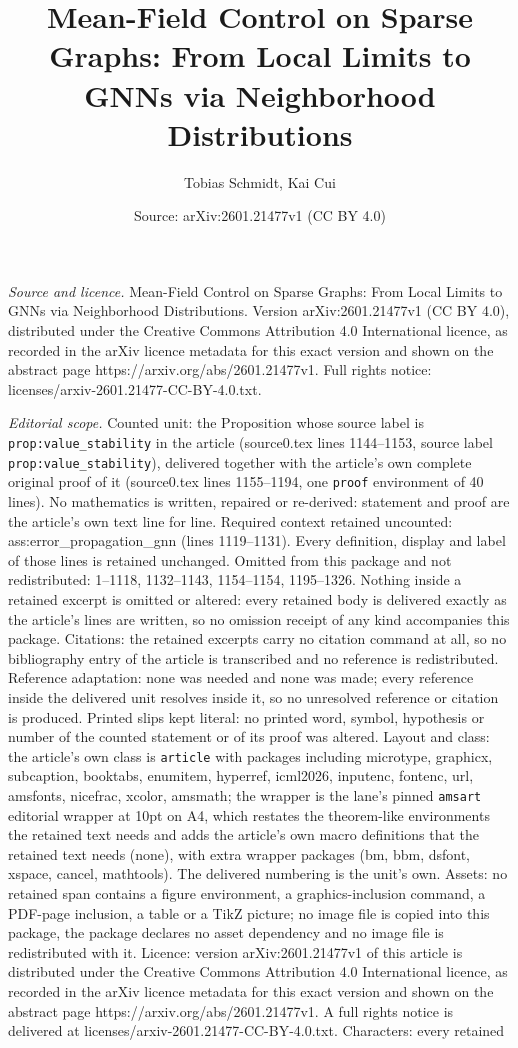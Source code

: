 \documentclass[10pt,a4paper]{amsart}
\title[Mean-Field Control on Sparse Graphs: From Local Limits to GN]{Mean-Field Control on Sparse Graphs: From Local Limits to GNNs via Neighborhood Distributions}
\author{Tobias Schmidt, Kai Cui}
\date{Source: arXiv:2601.21477v1 (CC BY 4.0)}
\begin{document}
\maketitle

\noindent\emph{Source and licence.} Mean-Field Control on Sparse Graphs: From Local Limits to GNNs via Neighborhood Distributions. Version arXiv:2601.21477v1 (CC BY 4.0), distributed under the Creative Commons Attribution 4.0 International licence, as recorded in the arXiv licence metadata for this exact version and shown on the abstract page https://arxiv.org/abs/2601.21477v1. Full rights notice: licenses/arxiv-2601.21477-CC-BY-4.0.txt.\par\smallskip

\noindent\textit{Editorial scope.} Counted unit: the Proposition whose source label is \texttt{prop:value\_stability} in the article (source0.tex lines 1144--1153, source label \texttt{prop:value\_stability}), delivered together with the article's own complete original proof of it (source0.tex lines 1155--1194, one \texttt{proof} environment of 40 lines). No mathematics is written, repaired or re-derived: statement and proof are the article's own text line for line. Required context retained uncounted: ass:error\_propagation\_gnn (lines 1119--1131). Every definition, display and label of those lines is retained unchanged. Omitted from this package and not redistributed: 1--1118, 1132--1143, 1154--1154, 1195--1326. Nothing inside a retained excerpt is omitted or altered: every retained body is delivered exactly as the article's lines are written, so no omission receipt of any kind accompanies this package. Citations: the retained excerpts carry no citation command at all, so no bibliography entry of the article is transcribed and no reference is redistributed. Reference adaptation: none was needed and none was made; every reference inside the delivered unit resolves inside it, so no unresolved reference or citation is produced. Printed slips kept literal: no printed word, symbol, hypothesis or number of the counted statement or of its proof was altered. Layout and class: the article's own class is \texttt{article} with packages including microtype, graphicx, subcaption, booktabs, enumitem, hyperref, icml2026, inputenc, fontenc, url, amsfonts, nicefrac, xcolor, amsmath; the wrapper is the lane's pinned \texttt{amsart} editorial wrapper at 10pt on A4, which restates the theorem-like environments the retained text needs and adds the article's own macro definitions that the retained text needs (none), with extra wrapper packages (bm, bbm, dsfont, xspace, cancel, mathtools). The delivered numbering is the unit's own. Assets: no retained span contains a figure environment, a graphics-inclusion command, a PDF-page inclusion, a table or a TikZ picture; no image file is copied into this package, the package declares no asset dependency and no image file is redistributed with it. Licence: version arXiv:2601.21477v1 of this article is distributed under the Creative Commons Attribution 4.0 International licence, as recorded in the arXiv licence metadata for this exact version and shown on the abstract page https://arxiv.org/abs/2601.21477v1. A full rights notice is delivered at licenses/arxiv-2601.21477-CC-BY-4.0.txt. Characters: every retained 
\end{document}
